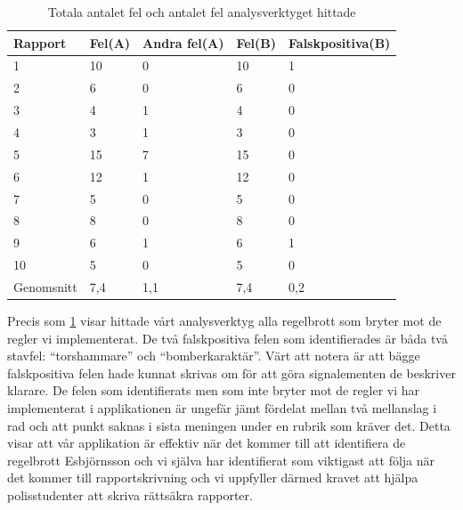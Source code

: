 \documentclass[swedish]{maucsthesis}
\begin{document}
\begin{table}[H]
\centering
\begin{tabular}{|l|l|l|l|l|}
\hline
Rapport    & Fel(A) & Andra fel(A) & Fel(B) & Falskpositiva(B) \\ \hline
1          & 10         & 0         & 10               & 1             \\ \hline
2          & 6          & 0         & 6                & 0             \\ \hline
3          & 4          & 1         & 4                & 0             \\ \hline
4          & 3          & 1         & 3                & 0             \\ \hline
5          & 15         & 7         & 15               & 0             \\ \hline
6          & 12         & 1         & 12               & 0             \\ \hline
7          & 5          & 0         & 5                & 0             \\ \hline
8          & 8          & 0         & 8                & 0             \\ \hline
9          & 6          & 1         & 6                & 1             \\ \hline
10         & 5          & 0         & 5                & 0             \\ \hline
Genomsnitt & 7,4        & 1,1       & 7,4              & 0,2           \\ \hline
\end{tabular}
\caption{Totala antalet fel och antalet fel analysverktyget hittade}
\label{ungradedtable}
\end{table}

Precis som \cref{ungradedtable} visar hittade vårt analysverktyg alla regelbrott som bryter mot de regler vi implementerat. De två falskpositiva felen som identifierades är båda två stavfel: ``torshammare'' och ``bomberkaraktär''. 
Värt att notera är att bägge falskpositiva felen hade kunnat skrivas om för att göra signalementen de beskriver klarare. De felen som identifierats men som inte bryter mot 
de regler vi har implementerat i applikationen är ungefär jämt fördelat mellan två mellanslag i rad och att punkt saknas i sista meningen under en rubrik som kräver det.
Detta visar att vår applikation är effektiv när det kommer till att identifiera de regelbrott Esbjörnsson och vi själva har identifierat som viktigast att följa när det kommer till rapportskrivning och vi uppfyller därmed
kravet att hjälpa polisstudenter att skriva rättsäkra rapporter.
\end{document}
